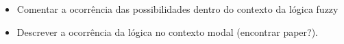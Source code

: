 \cite{possibilistilogic}
\begin{itemize}
    \item Comentar a ocorrência das possibilidades dentro do contexto da lógica fuzzy
    \item Descrever a ocorrência da lógica no contexto modal (encontrar paper?). 

\end{itemize}